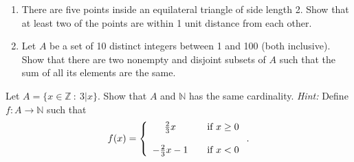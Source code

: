 \documentclass{article}
\newcommand{\Z}{\mathbb{Z}}
\newcommand{\N}{\mathbb{N}}
\theoremstyle{definition}
\begin{document}
\begin{question}
    \begin{enumerate}
	\item There are five points inside an equilateral triangle of side length 2. 
	Show that at least two of the points are within 1 unit distance from each other.
	\item Let $A$ be a set of 10 distinct integers between 1 and 100 (both inclusive). 
	Show that there are two nonempty and disjoint subsets of $A$ such that the sum of all its elements are the same.
    \end{enumerate}
\end{question}
\begin{solution}
\end{solution}


\begin{question}
    Let $A = \{ x \in \Z ~:~ 3|x \}$.  Show that $A$ and $\mathbb{N}$ has the same cardinality.  {\it Hint:} Define $f: A \rightarrow \N$ such that
\[ f(x) =\left\{\begin{array}{c c l} \frac{2}{3}x & & \text{if } x \geq 0 \\ ~ \\ -\frac{2}{3}x - 1 &  & \text{if } x < 0 \end{array} \right. .\]
\end{question}
\begin{solution}
\end{solution}
\end{document}

